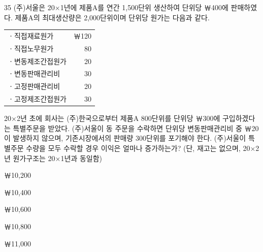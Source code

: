 \begin{question}{35}
(주)서울은 20×1년에 제품A를 연간 1,500단위 생산하여 단위당 ￦400에 판매하였다. 제품A의 최대생산량은 2,000단위이며 단위당 원가는 다음과 같다.

{\small\centering
\begin{tabular}{|lr|}
\hline
ㆍ직접재료원가 & ￦120 \\
ㆍ직접노무원가 & 80 \\
ㆍ변동제조간접원가 & 20 \\
ㆍ변동판매관리비 & 30 \\
ㆍ고정판매관리비 & 20 \\
ㆍ고정제조간접원가 & 30 \\
\hline
\end{tabular}\par}

20×2년 초에 회사는 (주)한국으로부터 제품A 800단위를 단위당 ￦300에 구입하겠다는 특별주문을 받았다. (주)서울이 동 주문을 수락하면 단위당 변동판매관리비 중 ￦20이 발생하지 않으며, 기존시장에서의 판매량 300단위를 포기해야 한다. (주)서울이 특별주문 수량을 모두 수락할 경우 이익은 얼마나 증가하는가? (단, 재고는 없으며, 20×2년 원가구조는 20×1년과 동일함) \par
\begin{choices}
  \item ￦10,200
  \item ￦10,400
  \item ￦10,600
  \item ￦10,800
  \item ￦11,000
\end{choices}
\end{question}
